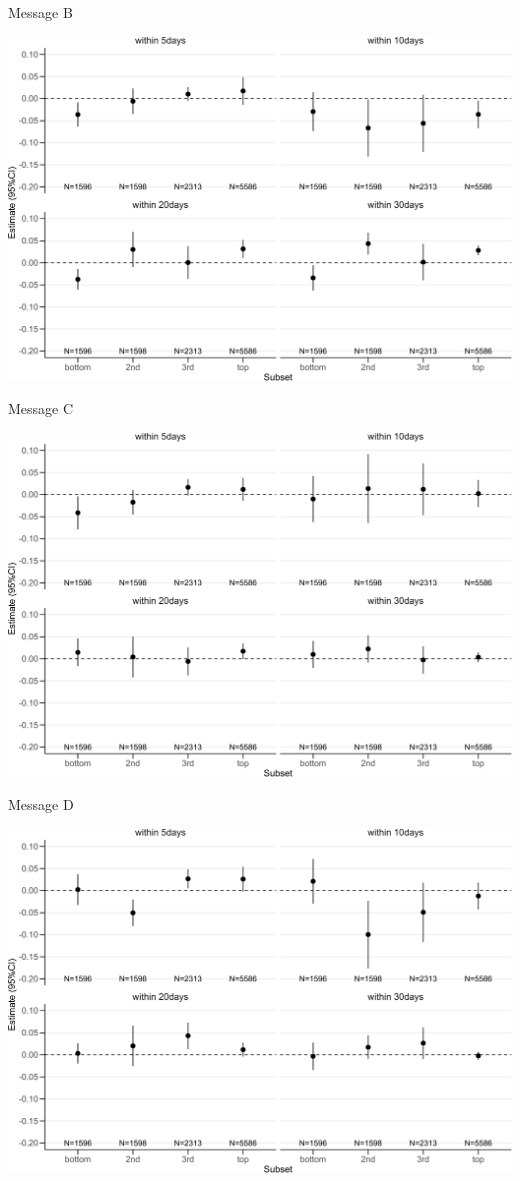 \documentclass[
      aspectratio=169,
        12pt,
    ]{beamer}
\begin{document}
\begin{frame}{Message B}
\protect\hypertarget{message-b-2}{}
\begin{center}\includegraphics[width=0.75\linewidth]{report_files/figure-beamer/plotB-geographical-hetero-secondaries-1} \end{center}
\end{frame}

\begin{frame}{Message C}
\protect\hypertarget{message-c-2}{}
\begin{center}\includegraphics[width=0.75\linewidth]{report_files/figure-beamer/plotC-geographical-hetero-secondaries-1} \end{center}
\end{frame}

\begin{frame}{Message D}
\protect\hypertarget{message-d-2}{}
\begin{center}\includegraphics[width=0.75\linewidth]{report_files/figure-beamer/plotD-geographical-hetero-secondaries-1} \end{center}
\end{frame}
\end{document}
